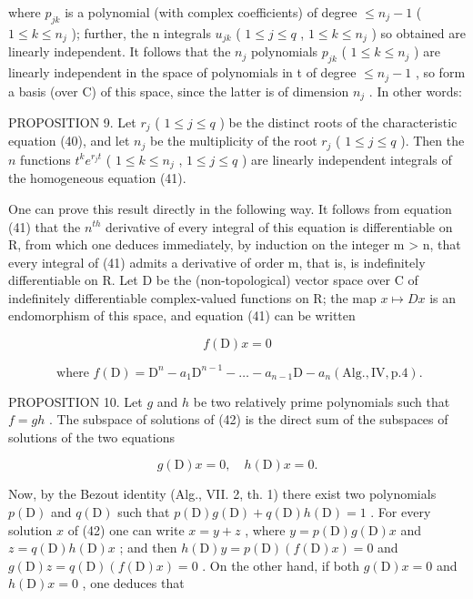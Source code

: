 where \(p_{jk}\) is a polynomial (with complex coefficients) of degree \(\leqslant n_{j}-1\) ( \(1\leqslant k\leqslant n_{j}\) ); further, the n integrals \(u_{jk}\) ( \(1\leqslant j\leqslant q\) , \(1\leqslant k\leqslant n_{j}\) ) so obtained are linearly independent. It follows that the \(n_{j}\) polynomials \(p_{jk}\) ( \(1\leqslant k\leqslant n_{j}\) ) are linearly independent in the space of polynomials in t of degree \(\leqslant n_{j}-1\) , so form a basis (over C) of this space, since the latter is of dimension \(n_{j}\) . In other words:

PROPOSITION 9. Let \(r_j\) ( \(1 \leqslant j \leqslant q\) ) be the distinct roots of the characteristic equation (40), and let \(n_j\) be the multiplicity of the root \(r_j\) ( \(1 \leqslant j \leqslant q\) ). Then the \(n\) functions \(t^k e^{r_j t}\) ( \(1 \leqslant k \leqslant n_j\) , \(1 \leqslant j \leqslant q\) ) are linearly independent integrals of the homogeneous equation (41).

One can prove this result directly in the following way. It follows from equation (41) that the \(n^{th}\) derivative of every integral of this equation is differentiable on R, from which one deduces immediately, by induction on the integer m \textgreater{} n, that every integral of (41) admits a derivative of order m, that is, is indefinitely differentiable on R. Let D be the (non-topological) vector space over C of indefinitely differentiable complex-valued functions on R; the map \(x \mapsto Dx\) is an endomorphism of this space, and equation (41) can be written

\[
f (\mathrm{D}) x = 0\tag{42}
\]

\[
\text { where } f (\mathrm{D}) = \mathrm{D} ^ {n} - a _ {1} \mathrm{D} ^ {n - 1} - \dots - a _ {n - 1} \mathrm{D} - a _ {n} (\mathrm{Alg}., \mathrm{IV}, \mathrm{p}. 4).
\]

PROPOSITION 10. Let \(g\) and \(h\) be two relatively prime polynomials such that \(f = gh\) . The subspace of solutions of (42) is the direct sum of the subspaces of solutions of the two equations

\[
g (\mathrm{D}) x = 0, \quad h (\mathrm{D}) x = 0.
\]

Now, by the Bezout identity (Alg., VII. 2, th. 1) there exist two polynomials \(p(\mathrm{D})\) and \(q(\mathrm{D})\) such that \(p(\mathrm{D})g(\mathrm{D}) + q(\mathrm{D})h(\mathrm{D}) = 1\) . For every solution \(x\) of (42) one can write \(x = y + z\) , where \(y = p(\mathrm{D})g(\mathrm{D})x\) and \(z = q(\mathrm{D})h(\mathrm{D})x\) ; and then \(h(\mathrm{D})y = p(\mathrm{D})(f(\mathrm{D})x) = 0\) and \(g(\mathrm{D})z = q(\mathrm{D})(f(\mathrm{D})x) = 0\) . On the other hand, if both \(g(\mathrm{D})x = 0\) and \(h(\mathrm{D})x = 0\) , one deduces that

